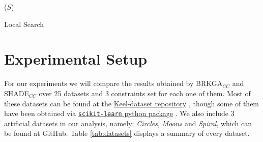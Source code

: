 \documentclass[review]{elsarticle}
\begin{document}
\begin{algorithm}
	\SetNlSkip{0.5em}
	\BlankLine
	\BlankLine
	\KwRet ($S$)

\caption{Local Search}\label{alg:LS}
\end{algorithm}

\clearpage

\section{Experimental Setup} \label{sec:expSetup}

For our experiments we will compare the results obtained by BRKGA$_{CC}$ and SHADE$_{CC}$ over 25 datasets and 3 constraints set for each one of them. Most of these datasets can be found at the \href{https://sci2s.ugr.es/keel/category.php?cat=clas}{Keel-dataset repository} \cite{triguero2017keel}, though some of them have been obtained via
\href{https://scikit-learn.org/stable/datasets/index.html}{\texttt{scikit-learn} python package} \cite{scikit-learn}. We also include 3 artificial datasets in our analysis, namely: \textit{Circles}, \textit{Moons} and \textit{Spiral}, which can be found at GitHub. Table \ref{tab:datasets} displays a summary of every dataset.
\end{document}
